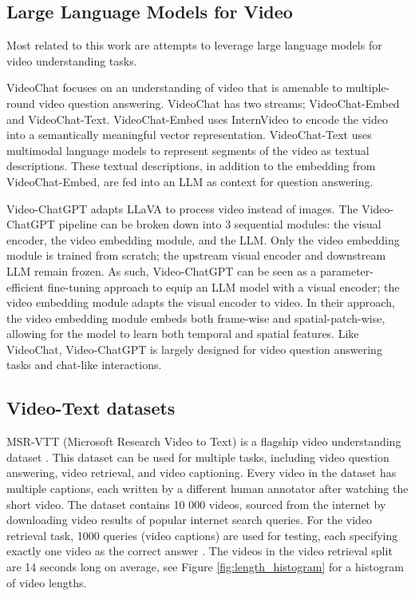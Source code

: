 \subsection{Large Language Models for Video}

Most related to this work are attempts to leverage large language models for video understanding tasks.

VideoChat \cite{videochat} focuses on an understanding of video that is amenable to multiple-round video question answering.
VideoChat has two streams; VideoChat-Embed and VideoChat-Text.
VideoChat-Embed uses InternVideo to encode the video into a semantically meaningful vector representation.
VideoChat-Text uses multimodal language models to represent segments of the video as textual descriptions. 
These textual descriptions, in addition to the embedding from VideoChat-Embed, are fed into an LLM as context for question answering.

Video-ChatGPT \cite{videochatgpt} adapts LLaVA to process video instead of images.
The Video-ChatGPT pipeline can be broken down into 3 sequential modules: the visual encoder, the video embedding module, and the LLM.
Only the video embedding module is trained from scratch; the upstream visual encoder and downstream LLM remain frozen.
As such, Video-ChatGPT can be seen as a parameter-efficient fine-tuning approach to equip an LLM model with a visual encoder; the video embedding module adapts the visual encoder to video.
In their approach, the video embedding module embeds both frame-wise and spatial-patch-wise, allowing for the model to learn both temporal and spatial features.
Like VideoChat, Video-ChatGPT is largely designed for video question answering tasks and chat-like interactions.

\subsection{Video-Text datasets}
MSR-VTT (Microsoft Research Video to Text) is a flagship video understanding dataset \cite{msr-vtt}.
This dataset can be used for multiple tasks, including video question answering, video retrieval, and video captioning.
Every video in the dataset has multiple captions, each written by a different human annotator after watching the short video.
The dataset contains 10 000 videos, sourced from the internet by downloading video results of popular internet search queries.
For the video retrieval task, 1000 queries (video captions) are used for testing, each specifying exactly one video as the correct answer \cite{jsfusion}.
The videos in the video retrieval split are 14 seconds long on average, see Figure \ref{fig:length_histogram} for a histogram of video lengths.

